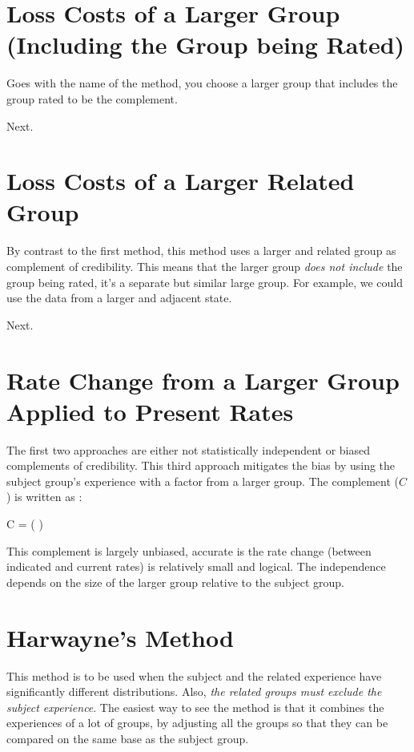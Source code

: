 \documentclass[11pt, english]{memoir}
\numberwithin{definition}{section}
\begin{document}
\section{Loss Costs of a Larger Group (Including the Group being Rated)}

Goes with the name of the method, you choose a larger group that includes the group rated to be the complement. 

Next.

\section{Loss Costs of a Larger Related Group}

By contrast to the first method, this method uses a larger and related group as complement of credibility. This means that the larger group \emph{does not include} the group being rated, it's a separate but similar large group. For example, we could use the data from a larger and adjacent state.

Next.



\section{Rate Change from a Larger Group Applied to Present Rates}

The first two approaches are either not statistically independent or biased complements of credibility. This third approach mitigates the bias by using the subject group's experience with a factor from a larger group. The complement ($ C $) is written as : 
\begin{tcolorbox}
C =  \times \left(  \right) 
\end{tcolorbox}
This complement is largely unbiased, accurate is the rate change (between indicated and current rates) is relatively small and logical. The independence depends on the size of the larger group relative to the subject group. 







\section{Harwayne's Method}
This method is to be used when the subject and the related experience have significantly different distributions. Also, \emph{the related groups must exclude the subject experience}. The easiest way to see the method is that it combines the experiences of a lot of groups, by adjusting all the groups so that they can be compared on the same base as the subject group. 
\end{document}
